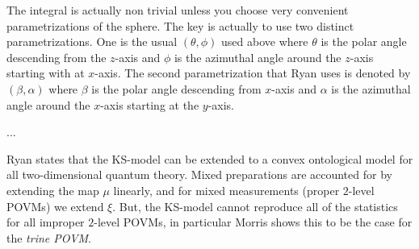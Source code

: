 \documentclass[12pt,draft]{article}
\theoremstyle{definition}
\theoremstyle{plain}
\begin{document}
{        The integral is actually non trivial unless you
        choose very convenient parametrizations of the
        sphere. The key is actually to use two distinct
        parametrizations. One is the usual $(\theta,\phi)$ 
        used above where $\theta$ is the polar angle
        descending from the $z$-axis and $\phi$ is the
        azimuthal angle around the $z$-axis starting with
        at $x$-axis. The second parametrization that Ryan
        uses is denoted by $(\beta,\alpha)$ where $\beta$ is
        the polar angle descending from $x$-axis and
        $\alpha$ is the azimuthal angle around the $x$-axis
        starting at the $y$-axis.

        ...
    }

    Ryan states that the KS-model can be extended to a
    convex ontological model for all two-dimensional quantum
    theory. Mixed preparations are accounted for by
    extending the map $\mu$ linearly, and for mixed
    measurements (proper $2$-level POVMs) we extend $\xi$.
    But, the KS-model cannot reproduce all of the statistics
    for all improper $2$-level POVMs, in particular Morris
    shows this to be the case for the \textit{trine POVM}.
\end{document}
